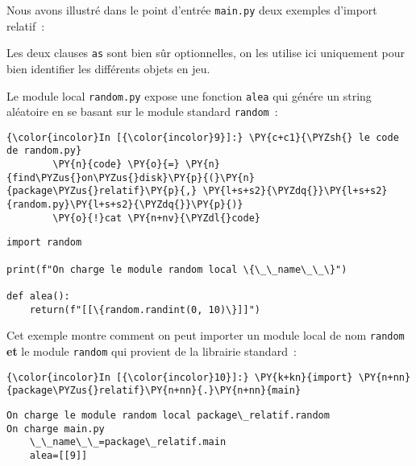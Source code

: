     Nous avons illustré dans le point d'entrée \texttt{main.py} deux
exemples d'import relatif~:

    Les deux clauses \texttt{as} sont bien sûr optionnelles, on les utilise
ici uniquement pour bien identifier les différents objets en jeu.

    Le module local \texttt{random.py} expose une fonction \texttt{alea} qui
génére un string aléatoire en se basant sur le module standard
\texttt{random}~:

    \begin{Verbatim}[commandchars=\\\{\},frame=single,framerule=0.3mm,rulecolor=\color{cellframecolor}]
{\color{incolor}In [{\color{incolor}9}]:} \PY{c+c1}{\PYZsh{} le code de random.py}
        \PY{n}{code} \PY{o}{=} \PY{n}{find\PYZus{}on\PYZus{}disk}\PY{p}{(}\PY{n}{package\PYZus{}relatif}\PY{p}{,} \PY{l+s+s2}{\PYZdq{}}\PY{l+s+s2}{random.py}\PY{l+s+s2}{\PYZdq{}}\PY{p}{)}
        \PY{o}{!}cat \PY{n+nv}{\PYZdl{}code}
\end{Verbatim}


    \begin{Verbatim}[commandchars=\\\{\},frame=single,framerule=0.3mm,rulecolor=\color{cellframecolor}]
import random

print(f"On charge le module random local \{\_\_name\_\_\}")

def alea():
    return(f"[[\{random.randint(0, 10)\}]]")
\end{Verbatim}

    Cet exemple montre comment on peut importer un module local de nom
\texttt{random} \textbf{et} le module \texttt{random} qui provient de la
librairie standard~:

    \begin{Verbatim}[commandchars=\\\{\},frame=single,framerule=0.3mm,rulecolor=\color{cellframecolor}]
{\color{incolor}In [{\color{incolor}10}]:} \PY{k+kn}{import} \PY{n+nn}{package\PYZus{}relatif}\PY{n+nn}{.}\PY{n+nn}{main}
\end{Verbatim}


    \begin{Verbatim}[commandchars=\\\{\},frame=single,framerule=0.3mm,rulecolor=\color{cellframecolor}]
On charge le module random local package\_relatif.random
On charge main.py
    \_\_name\_\_=package\_relatif.main
    alea=[[9]]
\end{Verbatim}

